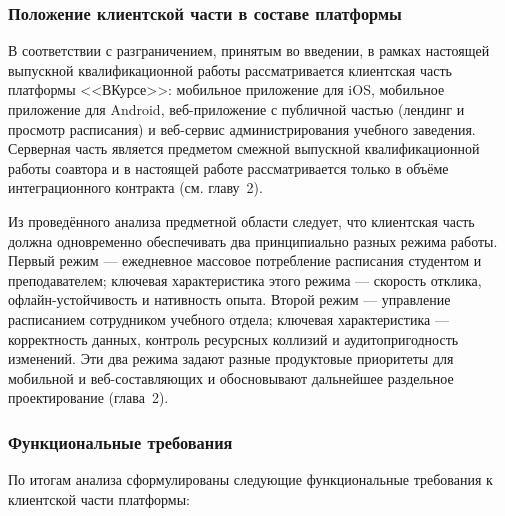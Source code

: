 \subsubsection{Положение клиентской части в составе платформы}

В соответствии с разграничением, принятым во введении, в рамках настоящей выпускной квалификационной работы рассматривается клиентская часть платформы <<ВКурсе>>: мобильное приложение для iOS, мобильное приложение для Android, веб-приложение с публичной частью (лендинг и просмотр расписания) и веб-сервис администрирования учебного заведения. Серверная часть является предметом смежной выпускной квалификационной работы соавтора и в настоящей работе рассматривается только в объёме интеграционного контракта (см. главу~2).

Из проведённого анализа предметной области следует, что клиентская часть должна одновременно обеспечивать два принципиально разных режима работы. Первый режим --- ежедневное массовое потребление расписания студентом и преподавателем; ключевая характеристика этого режима --- скорость отклика, офлайн-устойчивость и нативность опыта. Второй режим --- управление расписанием сотрудником учебного отдела; ключевая характеристика --- корректность данных, контроль ресурсных коллизий и аудитопригодность изменений. Эти два режима задают разные продуктовые приоритеты для мобильной и веб-составляющих и обосновывают дальнейшее раздельное проектирование (глава~2).

\subsubsection{Функциональные требования}
\label{subsubsec:fr}

По итогам анализа сформулированы следующие функциональные требования к клиентской части платформы:

